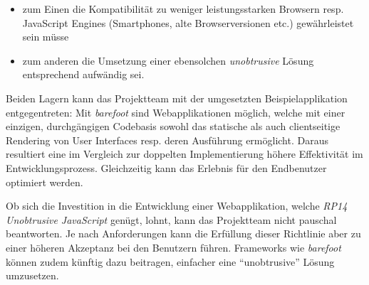 \begin{itemize}
	\item zum Einen die Kompatibilität zu weniger leistungsstarken Browsern resp. JavaScript Engines (Smartphones, alte Browserversionen etc.) gewährleistet sein müsse
	\item zum anderen die Umsetzung einer ebensolchen \emph{unobtrusive} Lösung entsprechend aufwändig sei.
\end{itemize}

Beiden Lagern kann das Projektteam mit der umgesetzten Beispielapplikation entgegentreten: Mit \emph{barefoot} sind Webapplikationen möglich, welche mit einer einzigen, durchgängigen Codebasis sowohl das statische als auch clientseitige Rendering von User Interfaces resp. deren Ausführung ermöglicht. Daraus resultiert eine im Vergleich zur doppelten Implementierung höhere Effektivität im Entwicklungsprozess. Gleichzeitig kann das Erlebnis für den Endbenutzer optimiert werden.

Ob sich die Investition in die Entwicklung einer Webapplikation, welche \emph{RP14 Unobtrusive JavaScript} genügt, lohnt, kann das Projektteam nicht pauschal beantworten. Je nach Anforderungen kann die Erfüllung dieser Richtlinie aber zu einer höheren Akzeptanz bei den Benutzern führen. Frameworks wie \emph{barefoot} können zudem künftig dazu beitragen, einfacher eine ``unobtrusive'' Lösung umzusetzen.
